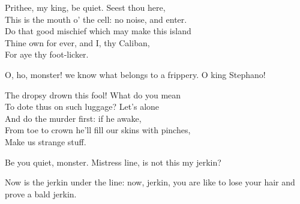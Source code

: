 



\begin{verse_speech}[Caliban] 
Prithee, my king, be quiet. Seest thou here,\\
This is the mouth o' the cell: no noise, and enter.\\
Do that good mischief which may make this island\\
Thine own for ever, and I, thy Caliban,\\
For aye thy foot-licker.
\end{verse_speech}




\begin{prose_speech}[Trinculo]
O, ho, monster! we know what belongs to a frippery.
O king Stephano!
\end{prose_speech}



\begin{verse_speech}[Caliban] 
The dropsy drown this fool! What do you mean\\
To dote thus on such luggage? Let's alone\\
And do the murder first: if he awake,\\
From toe to crown he'll fill our skins with pinches,\\
Make us strange stuff.
\end{verse_speech}

\begin{prose_speech}[Stephano]
Be you quiet, monster. Mistress line, is not this my jerkin? 


Now is the jerkin under the line: now, jerkin, you are like to lose your hair and prove a bald jerkin.
\end{prose_speech}


